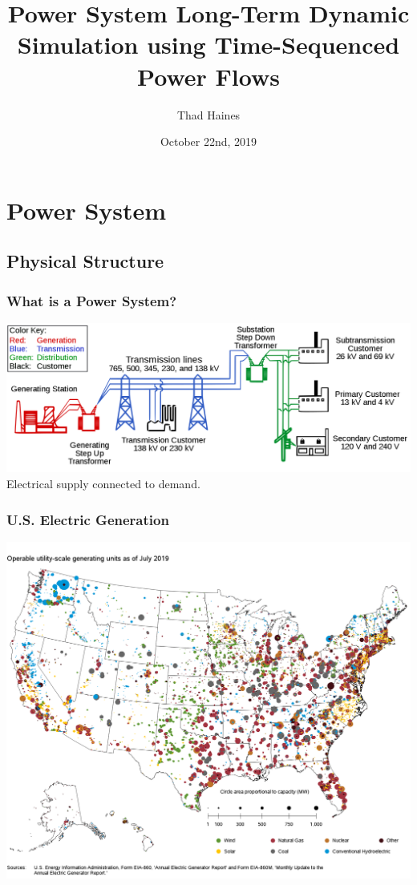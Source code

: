 \documentclass[14pt, unknownkeysallowed]{beamer}
\title{Power System Long-Term Dynamic Simulation using Time-Sequenced \\Power Flows}
\author{Thad Haines}
\institute[MT TECH]{Montana Technological University - Master's Thesis Research Project}
\date{October 22nd, 2019}
\begin{document}
	
\begin{frame}
	\titlepage
\end{frame}

\section{Power System}
\subsection{Physical Structure}
\begin{frame}
\frametitle{What is a Power System?}
\includegraphics[width=\linewidth]{largeGrid} %
Electrical supply connected to demand.\\
\end{frame}
\begin{frame}
\frametitle{U.S. Electric Generation}
{\centering
\includegraphics[height=.9\textheight]{july2019map} %
}
\end{frame}
\end{document}
